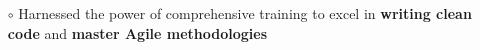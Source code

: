 \documentclass[10.8pt, a4paper]{extarticle}
\newcommand{\shorterSection}[1]{\vspace{-10pt}\section{#1}}
\begin{document}
\begin{itemize}
\begin{itemize}
          \item[$\circ$] Harnessed the power of comprehensive training to excel in \textbf{writing clean code} and \textbf{master Agile methodologies} \\[-0.6cm]
    \end{itemize}
    \vspace{0.055cm}
\end{itemize}

\end{document}
